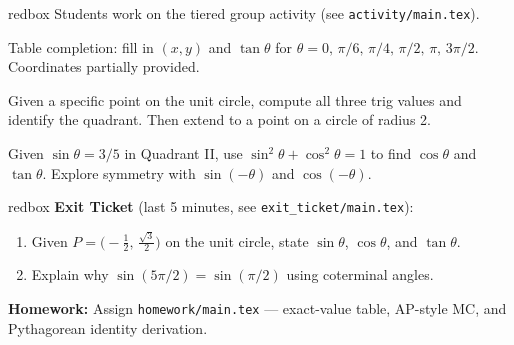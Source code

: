 \documentclass[10pt]{article}
\begin{document}
\vspace{6pt}

\begin{skillbox}{redbox}
  Students work on the tiered group activity (see \texttt{activity/main.tex}).

  \begin{tcolorbox}[colback=white, colframe=black!40,
      title=\textbf{Tier R --- Remediate},
      fonttitle=\bfseries, arc=2mm, left=3mm, right=3mm, top=2mm, bottom=2mm]
    Table completion: fill in $(x,y)$ and $\tan\theta$ for $\theta = 0,\, \pi/6,\, \pi/4,\,
    \pi/2,\, \pi,\, 3\pi/2$. Coordinates partially provided.
  \end{tcolorbox}

  \vspace{4pt}

  \begin{tcolorbox}[colback=white, colframe=black!40,
      title=\textbf{Tier A --- On Level},
      fonttitle=\bfseries, arc=2mm, left=3mm, right=3mm, top=2mm, bottom=2mm]
    Given a specific point on the unit circle, compute all three trig values and identify the
    quadrant. Then extend to a point on a circle of radius 2.
  \end{tcolorbox}

  \vspace{4pt}

  \begin{tcolorbox}[colback=white, colframe=black!40,
      title=\textbf{Tier E --- Extend},
      fonttitle=\bfseries, arc=2mm, left=3mm, right=3mm, top=2mm, bottom=2mm]
    Given $\sin\theta = 3/5$ in Quadrant II, use $\sin^2\theta + \cos^2\theta = 1$ to find
    $\cos\theta$ and $\tan\theta$. Explore symmetry with $\sin(-\theta)$ and $\cos(-\theta)$.
  \end{tcolorbox}
\end{skillbox}

\vspace{6pt}

\begin{skillbox}{redbox}
  \textbf{Exit Ticket} (last 5 minutes, see \texttt{exit\_ticket/main.tex}):
  \begin{enumerate}[leftmargin=1.6em, itemsep=2pt]
    \item Given $P = \bigl(-\tfrac{1}{2},\, \tfrac{\sqrt{3}}{2}\bigr)$ on the unit circle,
          state $\sin\theta$, $\cos\theta$, and $\tan\theta$.
    \item Explain why $\sin(5\pi/2) = \sin(\pi/2)$ using coterminal angles.
  \end{enumerate}
  \textbf{Homework:} Assign \texttt{homework/main.tex} --- exact-value table, AP-style MC, and
  Pythagorean identity derivation.
\end{skillbox}
\end{document}
